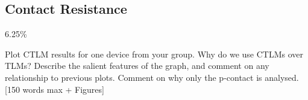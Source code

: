 \subsection{Contact Resistance}
\label{sec:test:contact}

6.25\%

Plot CTLM results for one device from your group. Why do we use CTLMs over TLMs? Describe the salient features of the graph, and comment on any relationship to previous plots. Comment on why only the p-contact is analysed. [150 words max + Figures]
